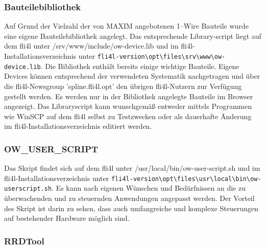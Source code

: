 \subsubsection{Bauteilebibliothek}
Auf Grund der Vielzahl der von MAXIM angebotenen 1--Wire Bauteile wurde eine eigene
Bauteilebibliothek angelegt. Das entsprechende Library-script liegt auf dem
fli4l unter /srv/www/include/ow-device.lib und im fli4l-Installationsverzeichnis unter
\verb!fli4l-version\opt\files\srv\www\ow-device.lib!. Die Bibliothek enthält bereits einige
wichtige Bauteile. Eigene Devices können entsprechend der verwendeten Systematik
nachgetragen und über die fli4l-Newsgroup 'spline.fli4l.opt' den übrigen
fli4l-Nutzern zur Verfügung gestellt werden. Es werden nur in der Bibliothek angelegte
Bauteile im Browser angezeigt. Das Libraryscript kann wunschgemäß entweder
mittels Programmen wie \glqq{}WinSCP\grqq{} auf dem fli4l selbst zu Testzwecken oder als
dauerhafte Änderung im fli4l-Installationsverzeichnis editiert werden.

{
\subsubsection{OW\_USER\_SCRIPT}
}
Das Skript findet sich auf dem fli4l unter /usr/local/bin/ow-user-script.sh und im
fli4l-Installationsverzeichnis unter \verb!fli4l-version\opt\files\usr\local\bin\ow-userscript.sh!.
Es kann nach eigenen Wünschen und Bedürfnissen an die zu überwachenden
und zu steuernden Anwendungen angepasst werden. Der Vorteil des Skript
ist darin zu sehen, dass auch umfangreiche und komplexe Steuerungen auf bestehender
Hardware möglich sind.

{
\subsubsection{RRDTool}
}
